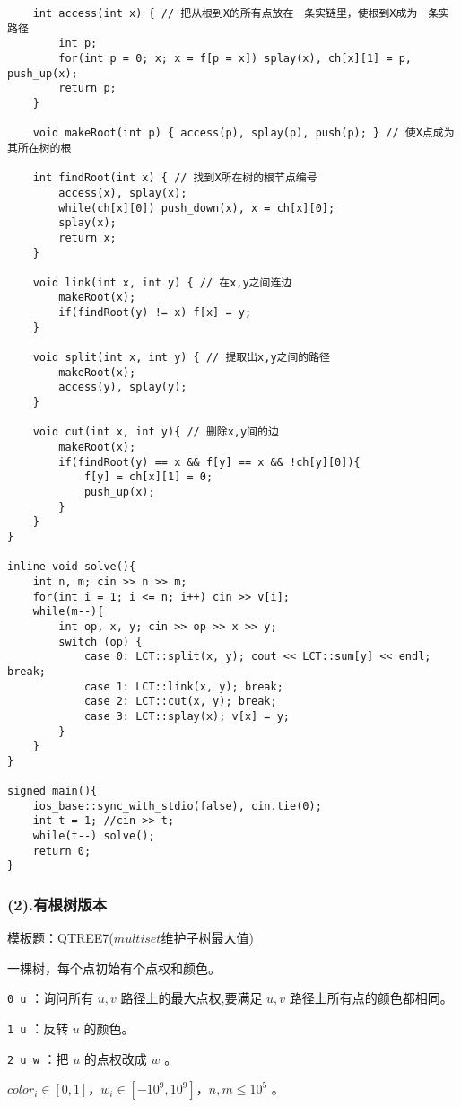 \documentclass[]{article}
\begin{document}
\begin{verbatim}
    int access(int x) { // 把从根到X的所有点放在一条实链里，使根到X成为一条实路径
        int p;
        for(int p = 0; x; x = f[p = x]) splay(x), ch[x][1] = p, push_up(x);
        return p;
    }

    void makeRoot(int p) { access(p), splay(p), push(p); } // 使X点成为其所在树的根

    int findRoot(int x) { // 找到X所在树的根节点编号
        access(x), splay(x);
        while(ch[x][0]) push_down(x), x = ch[x][0];
        splay(x);
        return x;
    }

    void link(int x, int y) { // 在x,y之间连边
        makeRoot(x);
        if(findRoot(y) != x) f[x] = y;
    }
    
    void split(int x, int y) { // 提取出x,y之间的路径
        makeRoot(x);
        access(y), splay(y);
    }

    void cut(int x, int y){ // 删除x,y间的边
        makeRoot(x);
        if(findRoot(y) == x && f[y] == x && !ch[y][0]){
            f[y] = ch[x][1] = 0;
            push_up(x);
        }
    }
}

inline void solve(){
    int n, m; cin >> n >> m;
    for(int i = 1; i <= n; i++) cin >> v[i];
    while(m--){
        int op, x, y; cin >> op >> x >> y;
        switch (op) {
            case 0: LCT::split(x, y); cout << LCT::sum[y] << endl; break;
            case 1: LCT::link(x, y); break;
            case 2: LCT::cut(x, y); break;
            case 3: LCT::splay(x); v[x] = y;
        }
    }
}

signed main(){
    ios_base::sync_with_stdio(false), cin.tie(0);
    int t = 1; //cin >> t;
    while(t--) solve();
    return 0;
}
\end{verbatim}

\hypertarget{ux6709ux6839ux6811ux7248ux672c}{%
\subsubsection{(2).有根树版本}\label{ux6709ux6839ux6811ux7248ux672c}}

模板题：QTREE7(\(multiset\)维护子树最大值)

一棵树，每个点初始有个点权和颜色。

\texttt{0\ u} ：询问所有 \(u,v\) 路径上的最大点权,要满足 \(u,v\)
路径上所有点的颜色都相同。

\texttt{1\ u} ：反转 \(u\) 的颜色。

\texttt{2\ u\ w} ：把 \(u\) 的点权改成 \(w\) 。

\(color_i\in[0,1]\)，\(w_i\in[-10^9,10^9]\)，\(n,m\le10^5\) 。
\end{document}
